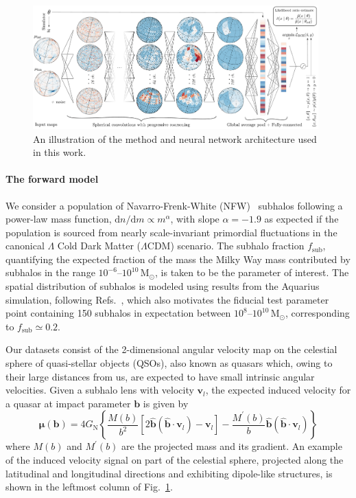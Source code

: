 \documentclass[]{article}
\begin{document}
\begin{figure}[!htbp]
\centering
\includegraphics[width=0.98\textwidth]{figures/drawing.pdf}
\caption{An illustration of the method and neural network architecture used in this work.}
\label{fig:model}
\end{figure}

\paragraph{The forward model} We consider a population of Navarro-Frenk-White (NFW)~\cite{Navarro:1995iw} subhalos following a power-law mass function, $\mathrm dn / \mathrm dm \propto m^\alpha$, with slope $\alpha = -1.9$ as expected if the population is sourced from nearly scale-invariant primordial fluctuations in the canonical $\Lambda$ Cold Dark Matter ($\Lambda$CDM) scenario. 
The subhalo fraction $f_\mathrm{sub}$, quantifying the expected fraction of the mass the Milky Way mass contributed by subhalos in the range $10^{-6}$--$10^{10}\,\mathrm{M}_\odot$, is taken to be the parameter of interest. The spatial distribution of subhalos is modeled using results from the Aquarius simulation, following Refs.~\cite{Hutten:2016jko,Springel:2008cc}, which also motivates the fiducial test parameter point containing 150 subhalos in expectation between $10^{8}$--$10^{10}\,\mathrm{M}_\odot$, corresponding to $f_\mathrm{sub} \simeq 0.2$.

Our datasets consist of the 2-dimensional angular velocity map on the celestial sphere of quasi-stellar objects (QSOs), also known as quasars which, owing to their large distances from us, are expected to have small intrinsic angular velocities. 
Given a subhalo lens with velocity $\mathbf{v}_{l}$, the expected induced velocity for a quasar at impact parameter $\mathbf{b}$ is given by~\cite{VanTilburg:2018ykj,Mishra-Sharma:2020ynk}
\begin{equation}
    \boldsymbol{\mu}(\mathbf{b})=4 G_{\mathrm{N}}\left\{\frac{M(b)}{b^{2}}\left[2 \hat{\mathbf{b}}\left(\hat{\mathbf{b}} \cdot \mathbf{v}_{l}\right)-\mathbf{v}_{l}\right]-\frac{M^{\prime}(b)}{b} \hat{\mathbf{b}}\left(\hat{\mathbf{b}} \cdot \mathbf{v}_{l}\right)\right\}
\end{equation}
where $M(b)$ and $M^{\prime}(b)$ are the projected mass and its gradient. An example of the induced velocity signal on part of the celestial sphere, projected along the latitudinal and longitudinal directions and exhibiting dipole-like structures, is shown in the leftmost column of Fig.~\ref{fig:model}.
\end{document}
